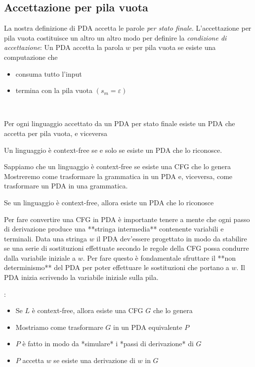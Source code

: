 \subsection{Accettazione per pila vuota}
La nostra definizione di PDA accetta le parole \textit{per stato finale}.
L'accettazione per pila vuota costituisce un altro un altro modo per definire la \textit{condizione di accettazione}:
Un PDA accetta la parola $w$ per pila vuota se esiste una computazione che
\begin{itemize}
	\item consuma tutto l’input
	\item termina con la pila vuota $(s_m = \varepsilon)$ 
\end{itemize}
\
\begin{theorem}
	Per ogni linguaggio accettato da un PDA per stato finale esiste un
	PDA che accetta per pila vuota, e viceversa
\end{theorem}

\begin{theorem}
	Un linguaggio è context-free se e solo se esiste un PDA che lo riconosce.
\end{theorem}
Sappiamo che un linguaggio è context-free se esiste una CFG che lo genera 
Mostreremo come trasformare la grammatica in un PDA e, viceversa, come trasformare un PDA in una grammatica. 

\begin{lemma}
	Se un linguaggio è context-free, allora esiste un PDA che lo riconosce
\end{lemma}
Per fare convertire una CFG in PDA è importante tenere a mente che ogni passo di derivazione produce una **stringa intermedia** contenente variabili e terminali.
Data una stringa $w$ il PDA dev'essere progettato in modo da stabilire se una serie di sostituzioni effettuate secondo le regole della CFG possa condurre dalla variabile iniziale a $w$.
Per fare questo è fondamentale sfruttare il **non determinismo** del PDA per poter effettuare le sostituzioni che portano a $w$. 
Il PDA inizia scrivendo la variabile iniziale sulla pila. 

:
\begin{itemize}
	\item Se $L$ è context-free, allora esiste una CFG $G$ che lo genera
	\item Mostriamo come trasformare $G$ in un PDA equivalente $P$
	\item $P$ è fatto in modo da *simulare* i *passi di derivazione* di $G$
	\item $P$ accetta $w$ se esiste una derivazione di $w$ in $G$
\end{itemize}


